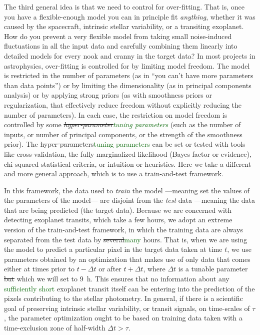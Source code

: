 \documentclass[12pt, preprint]{aastex}
\newcommand{\revise}[1]{\textcolor{darkgreen}{#1}}
\newcommand{\remove}[1]{\sout{#1}}
\begin{document}
The third general idea is that we need to control for over-fitting.
That is, once you have a flexible-enough model you can in principle fit \emph{anything},
  whether it was caused by the spacecraft, intrinsic stellar variability, or a transiting exoplanet.
How do you prevent a very flexible model from taking small noise-induced fluctuations in all the input data
  and carefully combining them linearly into detailed models for every nook and cranny in the target data?
In most projects in astrophysics, over-fitting is controlled for by limiting model freedom.
The model is restricted in the number of parameters
  (as in ``you can't have more parameters than data points'')
  or by limiting the dimensionality
  (as in principal components analysis)
  or by applying strong priors
  (as with smoothness priors or regularization, 
  that effectively reduce freedom without explicitly reducing the number of parameters).
In each case, the restriction on model freedom is controlled by some \emph{\remove{hyper-parameter}\revise{tuning parameters}}
  (such as the number of inputs, or number of principal components, or the strength of the smoothness prior).
The \remove{hyper-parameters}\revise{tuning parameters} can be set or tested with tools like cross-validation,
  the fully marginalized likelihood (Bayes factor or evidence),
  chi-squared statistical criteria,
  or intuition or heuristics.
Here we take a different and more general approach, which is to use a train-and-test framework.

In this framework, the data used to \emph{train} the model%
  ---meaning set the values of the parameters of the model---%
  are disjoint from the \emph{test} data
  ---meaning the data that are being predicted (the target data).
Because we are concerned with detecting exoplanet transits,
  which take a few hours,
  we adopt an extreme version of the train-and-test framework,
  in which the training data are always separated from the test data by \remove{several}\revise{many} hours.
That is, when we are using the model to predict a particular pixel in the target data taken at time $t$,
  we use parameters obtained by an optimization that makes use of only data
  that comes either at times prior to $t-\Delta t$ or after $t+\Delta t$,
  where $\Delta t$ is a tunable parameter \remove{but} which we will set to $9$~h.
This ensures that no information about any \revise{sufficiently short} exoplanet transit itself
  can be entering into the prediction of the pixels contributing to the stellar photometry.
In general, if there is a scientific goal of preserving intrinsic stellar variability,
  or transit signals,
  on time-scales of $\tau$,
  the parameter optimization ought to be based on training data taken with a time-exclusion zone of half-width $\Delta t > \tau$.
\end{document}
